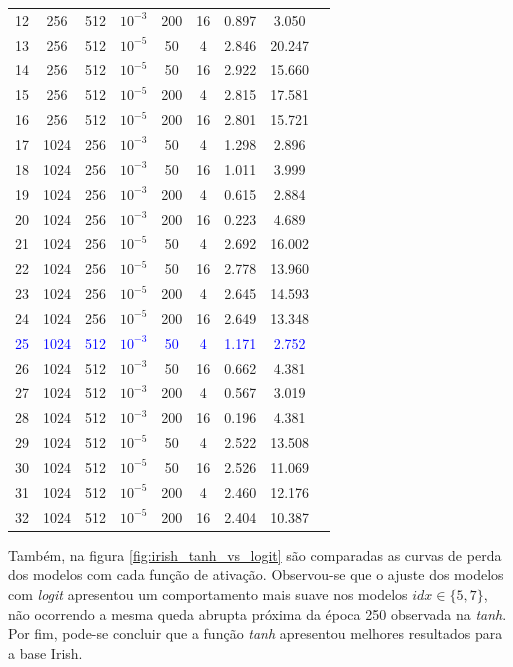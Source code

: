 \documentclass[twoside]{automatextcc}
\newcommand{\blue}[1]{\textcolor{blue}{#1}}
\begin{document}
\begin{table}[H]
{\begin{tabular}[t]{ccccccccc}
        12 & 256 & 512 & $10^{-3}$ & 200 & 16 & 0.897 & 3.050 \\
        13 & 256 & 512 & $10^{-5}$ & 50 & 4 & 2.846 & 20.247 \\
        14 & 256 & 512 & $10^{-5}$ & 50 & 16 & 2.922 & 15.660 \\
        15 & 256 & 512 & $10^{-5}$ & 200 & 4 & 2.815 & 17.581 \\
        16 & 256 & 512 & $10^{-5}$ & 200 & 16 & 2.801 & 15.721 \\
        17 & 1024 & 256 & $10^{-3}$ & 50 & 4 & 1.298 & 2.896 \\
        18 & 1024 & 256 & $10^{-3}$ & 50 & 16 & 1.011 & 3.999 \\
        19 & 1024 & 256 & $10^{-3}$ & 200 & 4 & 0.615 & 2.884 \\
        20 & 1024 & 256 & $10^{-3}$ & 200 & 16 & 0.223 & 4.689 \\
        21 & 1024 & 256 & $10^{-5}$ & 50 & 4 & 2.692 & 16.002 \\
        22 & 1024 & 256 & $10^{-5}$ & 50 & 16 & 2.778 & 13.960 \\
        23 & 1024 & 256 & $10^{-5}$ & 200 & 4 & 2.645 & 14.593 \\
        24 & 1024 & 256 & $10^{-5}$ & 200 & 16 & 2.649 & 13.348 \\
        
        \blue{25} & \blue{1024} & \blue{512} & \blue{$10^{-3}$} & \blue{50} & \blue{4} & \blue{1.171} & \blue{2.752} \\
        
        26 & 1024 & 512 & $10^{-3}$ & 50 & 16 & 0.662 & 4.381 \\
        27 & 1024 & 512 & $10^{-3}$ & 200 & 4 & 0.567 & 3.019 \\
        28 & 1024 & 512 & $10^{-3}$ & 200 & 16 & 0.196 & 4.381 \\
        29 & 1024 & 512 & $10^{-5}$ & 50 & 4 & 2.522 & 13.508 \\
        30 & 1024 & 512 & $10^{-5}$ & 50 & 16 & 2.526 & 11.069 \\
        31 & 1024 & 512 & $10^{-5}$ & 200 & 4 & 2.460 & 12.176 \\
        32 & 1024 & 512 & $10^{-5}$ & 200 & 16 & 2.404 & 10.387 \\
        \bottomrule
        \end{tabular}
    }
\end{table}

Também, na figura \ref{fig:irish_tanh_vs_logit} são comparadas as curvas de perda dos modelos com cada função de ativação. Observou-se que o ajuste dos modelos com \textit{logit} apresentou um comportamento mais suave nos modelos $idx \in \{5,7\}$, não ocorrendo a mesma queda abrupta próxima da época 250 observada na \textit{tanh}. Por fim, pode-se concluir que a função \textit{tanh} apresentou melhores resultados para a base Irish.  
\end{document}
